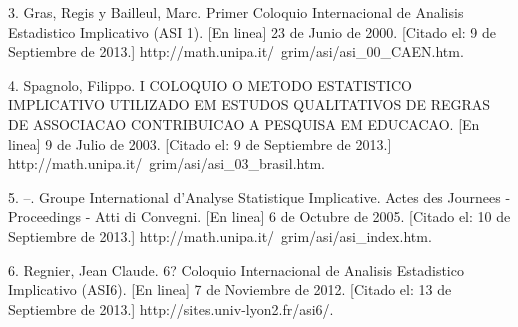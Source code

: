 3. Gras, Regis y Bailleul, Marc. Primer Coloquio Internacional de Analisis Estadistico Implicativo (ASI 1). [En linea] 23 de Junio de 2000. [Citado el: 9 de Septiembre de 2013.] http://math.unipa.it/~grim/asi/asi\_00\_CAEN.htm.

4. Spagnolo, Filippo. I COLOQUIO O METODO ESTATISTICO IMPLICATIVO UTILIZADO EM ESTUDOS QUALITATIVOS DE REGRAS DE ASSOCIACAO CONTRIBUICAO A PESQUISA EM EDUCACAO. [En linea] 9 de Julio de 2003. [Citado el: 9 de Septiembre de 2013.] http://math.unipa.it/~grim/asi/asi\_03\_brasil.htm.

5. --. Groupe International d'Analyse Statistique Implicative. Actes des Journees - Proceedings - Atti di Convegni. [En linea] 6 de Octubre de 2005. [Citado el: 10 de Septiembre de 2013.] http://math.unipa.it/~grim/asi/asi\_index.htm.

6. Regnier, Jean Claude. 6? Coloquio Internacional de Analisis Estadistico Implicativo (ASI6). [En linea] 7 de Noviembre de 2012. [Citado el: 13 de Septiembre de 2013.] http://sites.univ-lyon2.fr/asi6/.



%

%
